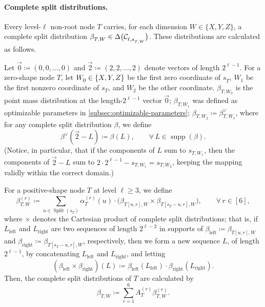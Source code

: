 \documentclass[11pt, a4paper, copyright, gdm]{google}
\theoremstyle{definition}
\theoremstyle{remark}
\theoremstyle{plain}
\DeclareMathOperator{\Split}{Split}
\newcommand{\defeq}{\coloneqq}
\DeclareMathOperator{\supp}{supp}
\DeclarePairedDelimiter{\bk}{(}{)}
\DeclarePairedDelimiter{\BK}{\{}{\}}
\begin{document}
\paragraph{Complete split distributions.}
Every level-$\ell$ non-root node $T$ carries, for each dimension $W \in \{X,Y,Z\}$, a complete split distribution $\beta_{T,W}^{} \in \Delta\bk[\big]{\mathcal C_{\ell, s_{T,W}^{}}^{}}$.  These distributions are calculated as follows.

Let $\vec{0} \defeq (0, 0, \dots, 0)$ and $\vec{2} \defeq (2, 2, \dots, 2)$ denote vectors of length $2^{\ell - 1}$.
For a zero-shape node $T$, let $W_0^{} \in \BK{X, Y, Z}$ be the first zero coordinate of $s_T^{}$, $W_1^{}$ be the first nonzero coordinate of $s_T^{}$, and $W_2^{}$ be the other coordinate. $\beta_{T, W_0}^{}$ is the point mass distribution at the length-$2^{\ell - 1}$ vector $\vec{0}$; $\beta_{T, W_1}^{}$ was defined as optimizable parameters in \cref{subsec:optimizable-parameters}; $\beta_{T, W_2}^{} \defeq \beta^{\vee}_{T, W_1}$, where for any complete split distribution $\beta$, we define
\[
  \beta^{\vee}(\vec{2} \!-\! L) \defeq \beta(L), \qquad \forall\, L \in {\supp(\beta)}.
\]
(Notice, in particular, that if the components of $L$ sum to $s_{T, W_1}$, then the components of $\vec{2} - L$ sum to $2 \cdot 2^{\ell-1} - s_{T, W_1} = s_{T, W_2}$, keeping the mapping validly within the correct domain.)

For a positive-shape node $T$ at level $\ell \ge 3$, we define
\[
  \beta_{T,W}^{(r)}
  \defeq \sum_{u\in\Split(s_T^{})}\alpha_T^{(r)}(u) \cdot
  \bigl(\beta_{T[u,r],W}^{}\times\beta_{T[s_T^{}-u,r],W}^{}\bigr),
  \qquad
  \forall\, r \in [6],
\]
where $\times$ denotes the Cartesian product of complete split distributions; that is, if $L_{\text{left}}$ and $L_{\text{right}}$ are two sequences of length $2^{\ell-2}$ in supports of 
$\beta_{\text{left}} \defeq \beta_{T[u,r],W}$
and $\beta_{\text{right}}\defeq\beta_{T[s_T^{}-u,r],W}$, respectively,
then we form a new sequence $L$, of length $2^{\ell-1}$, by concatenating $L_{\text{left}}$ and $L_{\text{right}}$,
and letting
\[
  (\beta_{\text{left}} \times \beta_{\text{right}})(L) \defeq \beta_{\text{left}}(L_{\text{left}}) \cdot \beta_{\text{right}}(L_{\text{right}}).
\]
Then, the complete split distributions of $T$ are calculated by
\[\beta_{T,W}^{} \defeq \sum_{r=1}^6 A_T^{(r)}\beta_{T,W}^{(r)}.\]
\end{document}
